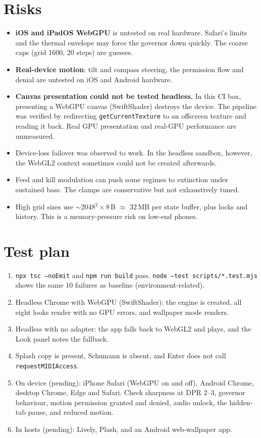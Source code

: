 \documentclass[10pt,a4paper]{article}
\newcommand{\code}[1]{\texttt{\small #1}}
\begin{document}
\section{Risks}
\begin{itemize}
\item \textbf{iOS and iPadOS WebGPU} is untested on real hardware. Safari's limits and the thermal envelope may force the governor down quickly.
The coarse caps (grid 1600, 20 steps) are guesses.
\item \textbf{Real-device motion}: tilt and compass steering, the permission flow and denial are untested on iOS and Android hardware.
\item \textbf{Canvas presentation could not be tested headless.} In this CI box, presenting a WebGPU canvas (SwiftShader) destroys the device.
The pipeline was verified by redirecting \code{getCurrentTexture} to an offscreen texture and reading it back. Real GPU presentation and
real-GPU performance are unmeasured.
\item Device-loss failover was observed to work. In the headless sandbox, however, the WebGL2 context sometimes could not be created afterwards.
\item Feed and kill modulation can push some regimes to extinction under sustained bass. The clamps are conservative but not exhaustively tuned.
\item High grid sizes use $\sim$2048$^2\times$8\,B $\approx$ 32\,MB per state buffer, plus locks and history. This is a memory-pressure risk on low-end phones.
\end{itemize}

\section{Test plan}
\begin{enumerate}
\item \code{npx tsc --noEmit} and \code{npm run build} pass. \code{node --test scripts/*.test.mjs} shows the same 10 failures as baseline (environment-related).
\item Headless Chrome with WebGPU (SwiftShader): the engine is created, all eight looks render with no GPU errors, and wallpaper mode renders.
\item Headless with no adapter: the app falls back to WebGL2 and plays, and the Look panel notes the fallback.
\item Splash copy is present, Schumann is absent, and Enter does not call \code{requestMIDIAccess}.
\item On device (pending): iPhone Safari (WebGPU on and off), Android Chrome, desktop Chrome, Edge and Safari. Check sharpness at DPR 2--3, governor behaviour,
motion permission granted and denied, audio unlock, the hidden-tab pause, and reduced motion.
\item In hosts (pending): Lively, Plash, and an Android web-wallpaper app.
\end{enumerate}
\end{document}

